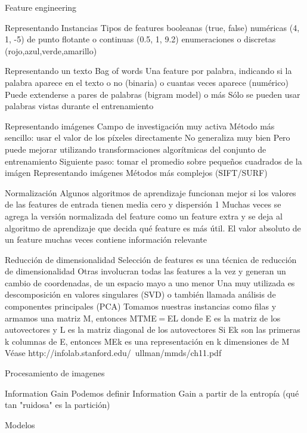 Feature engineering

Representando Instancias
Tipos de features
booleanas (true, false)
numéricas (4, 1, -5)
de punto flotante o continuas (0.5, 1, 9.2)
enumeraciones o discretas (rojo,azul,verde,amarillo)

Representando un texto
Bag of words
Una feature por palabra, indicando si la palabra aparece en el texto o no (binaria) o cuantas veces aparece (numérico)
Puede extenderse a pares de palabras (bigram model) o más
Sólo se pueden usar palabras vistas durante el entrenamiento

Representando imágenes
Campo de investigación muy activa
Método más sencillo: usar el valor de los píxeles directamente
No generaliza muy bien
Pero puede mejorar utilizando transformaciones algorítmicas del conjunto de entrenamiento
Siguiente paso: tomar el promedio sobre pequeños cuadrados de la imágen
Representando imágenes
Métodos más complejos (SIFT/SURF)


Normalización
Algunos algoritmos de aprendizaje funcionan mejor si los valores de las features de entrada tienen media cero y dispersión 1
Muchas veces se agrega la versión normalizada del feature como un feature extra y se deja al algoritmo de aprendizaje que decida qué feature es más útil.
El valor absoluto de un feature muchas veces contiene información relevante

Reducción de dimensionalidad
Selección de features es una técnica de reducción de dimensionalidad
Otras involucran todas las features a la vez y generan un cambio de coordenadas, de un espacio mayo a uno menor
Una muy utilizada es descomposición en valores singulares (SVD) o también llamada análisis de componentes principales (PCA)
Tomamos nuestras instancias como filas y armamos una matriz M, entonces
MTME = EL
donde E es la matriz de los autovectores y L es la matriz diagonal de los autovectores
Si Ek son las primeras k columnas de E, entonces MEk es una representación en k dimensiones de M
Véase http://infolab.stanford.edu/~ullman/mmds/ch11.pdf


Procesamiento de imagenes


Information Gain
Podemos definir Information Gain a partir de la entropía (qué tan "ruidosa" es la partición)

Modelos

